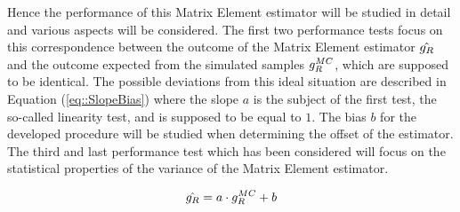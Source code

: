 Hence the performance of this Matrix Element estimator will be studied in detail and various aspects will be considered.
The first two performance tests focus on this correspondence between the outcome of the Matrix Element estimator $\hat{g_{R}}$ and the outcome expected from the simulated samples $g_{R}^{MC}$, which are supposed to be identical.
The possible deviations from this ideal situation are described in Equation (\ref{eq::SlopeBias}) where the slope $a$ is the subject of the first test, the so-called linearity test, and is supposed to be equal to $1$. The bias $b$ for the developed procedure will be studied when determining the offset of the estimator.
The third and last performance test which has been considered will focus on the statistical properties of the variance of the Matrix Element estimator.

%
\begin{equation} \label{eq::SlopeBias}
 \hat{g_R} = a \cdot g_{R}^{MC} + b
\end{equation}

